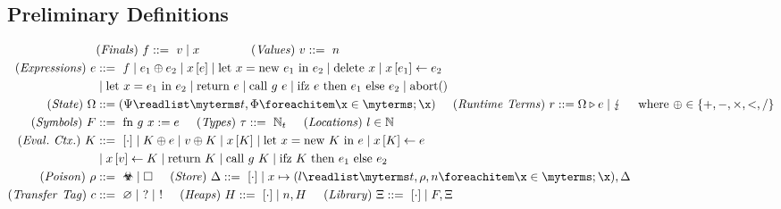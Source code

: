 \documentclass[acmsmall,review,screen,dvipsnames]{acmart}
\begin{document}
\subsection{Preliminary Definitions}\label{subsec:cs:defs}
\begin{gather*}
  \begin{aligned}
  &\mi{(Finals)}~\finalexpr\bnfdef\ \valueexpr \mid x\hspace{1.5cm}
  \mi{(Values)}~\valueexpr\bnfdef\ n\\
  \mi{(Expressions)}~\expr&\bnfdef\ \finalexpr \mid \lbinop{\expr[_{1}]}{\expr[_{2}]} \mid \lget{x}{\expr} \mid \lnew{x}{\expr[_{1}]}{\expr[_{2}]} \mid \ldelete{x} \mid \lset{x}{\expr[_{1}]}{\expr[_{2}]} \\
    & \mid \llet{x}{\expr[_{1}]}{\expr[_{2}]} \mid \lreturn{\expr} \mid \lcall{g}{\expr} \mid \lifz{\expr}{\expr[_{1}]}{\expr[_{2}]} \mid \labort \\
  \mi{(State)}~\statevar&\bnfdef \tup{\cfstate}{\sandboxtag,\memstate} \hspace{0.5cm}
  \mi{(Runtime~Terms)}~\runtimetermvar\bnfdef\rtt{\statevar}{\expr} \mid \lightning \hspace{0.5cm}
    \text{where}\ \lbinop{}{}\in\left\{+,-,\times,<,/\right\}\\
  \mi{(Symbols)}~\function&\bnfdef\ \lfunction{g}{x}{e}\hspace{0.5cm}
  \mi{(Types)}~\type\bnfdef\ \natt\hspace{0.5cm}
  \mi{(Locations)}~\loc\in\nat \\
  \mi{(Eval.~Ctx.)}~\ectx&\bnfdef\ \hole{\cdot} \mid \lbinop{\ectx}{\expr} \mid \lbinop{\valueexpr}{\ectx} \mid \lget{x}{\ectx} \mid \lnew{x}{\ectx}{\expr} \mid \lset{x}{\ectx}{\expr}\\
    & \mid \lset{x}{\valueexpr}{\ectx} \mid \lreturn{\ectx} \mid \lcall{g}{\ectx} \mid \lifz{\ectx}{\expr[_{1}]}{\expr[_{2}]} \\
  \mi{(Poison)}~\poison&\bnfdef\ \poisoned \mid \poisonless \hspace{0.5cm}
  \mi{(Store)}~\store\bnfdef\ \hole{\cdot} \mid \storeel{x}{\loc}{\sandboxtag}{\poison}{n},\store \\
  \mi{(Transfer~Tag)}~\comm&\bnfdef\ \nocomm \mid\ \ctxtocomp \mid\ \comptoctx \hspace{0.5cm}
  \mi{(Heaps)}~\heap\bnfdef\ \hole{\cdot} \mid n,\heap \hspace{0.5cm}
  \mi{(Library)}~\library\bnfdef\ \hole{\cdot} \mid \function,\library \\

\end{aligned}
\end{gather*}
\end{document}
